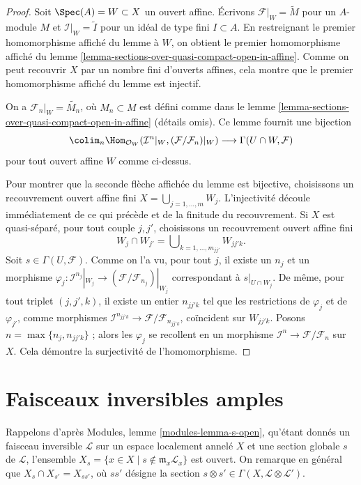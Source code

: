 \begin{proof}
Soit $\Spec(A) = W \subset X$ un ouvert affine. Écrivons
$\mathcal{F}|_W = \widetilde{M}$ pour un $A$-module $M$
et $\mathcal{I}|_W = \widetilde{I}$ pour un idéal de type fini
$I \subset A$. En restreignant le premier homomorphisme affiché
du lemme à $W$, on obtient le premier homomorphisme affiché du
lemme \ref{lemma-sections-over-quasi-compact-open-in-affine}.
Comme on peut recouvrir $X$ par un nombre fini d'ouverts affines,
cela montre que le premier homomorphisme affiché du lemme est injectif.

\medskip\noindent
On a $\mathcal{F}_n|_W = \widetilde{M_n}$, où
$M_n \subset M$ est défini comme dans le
lemme \ref{lemma-sections-over-quasi-compact-open-in-affine}
(détails omis). Ce lemme fournit une bijection
$$
\colim_n  \Hom_{\mathcal{O}_W}(
\mathcal{I}^n|_W, (\mathcal{F}/\mathcal{F}_n)|_W)
\longrightarrow
\Gamma(U \cap W, \mathcal{F})
$$
pour tout ouvert affine $W$ comme ci-dessus.

\medskip\noindent
Pour montrer que la seconde flèche affichée du lemme est bijective,
choisissons un recouvrement ouvert affine fini $X = \bigcup_{j = 1, \ldots, m} W_j$.
L'injectivité découle immédiatement de ce qui précède et de la finitude
du recouvrement. Si $X$ est quasi-séparé, pour tout couple
$j, j'$, choisissons un recouvrement ouvert affine fini
$$
W_j \cap W_{j'} = \bigcup\nolimits_{k = 1, \ldots, m_{jj'}} W_{jj'k}.
$$
Soit $s \in \Gamma(U, \mathcal{F})$. Comme on l'a vu, pour tout $j$, il existe
un $n_j$ et un morphisme
$\varphi_j : \mathcal{I}^{n_j}|_{W_j} \to
(\mathcal{F}/\mathcal{F}_{n_j})|_{W_j}$
correspondant à $s|_{U \cap W_j}$.
De même, pour tout triplet $(j, j', k)$, il existe un entier
$n_{jj'k}$ tel que les restrictions de $\varphi_j$ et de $\varphi_{j'}$,
comme morphismes $\mathcal{I}^{n_{jj'k}} \to \mathcal{F}/\mathcal{F}_{n_{jj'k}}$,
coïncident sur $W_{jj'k}$. Posons $n = \max\{n_j, n_{jj'k}\}$ ; alors
les $\varphi_j$ se recollent en un morphisme
$\mathcal{I}^n \to \mathcal{F}/\mathcal{F}_n$ sur $X$.
Cela démontre la surjectivité de l'homomorphisme.
\end{proof}

\section{Faisceaux inversibles amples}
\label{section-ample}

\noindent
Rappelons d'après Modules, lemme \ref{modules-lemma-s-open},
qu'étant donnés un faisceau inversible $\mathcal{L}$ sur un espace
localement annelé $X$ et une section globale $s$ de $\mathcal{L}$,
l'ensemble $X_s = \{x \in X \mid s \not \in \mathfrak m_x\mathcal{L}_x\}$
est ouvert. On remarque en général que
$X_s \cap X_{s'} = X_{ss'}$, où $ss'$ désigne
la section $s \otimes s' \in \Gamma(X, \mathcal{L} \otimes \mathcal{L}')$.

